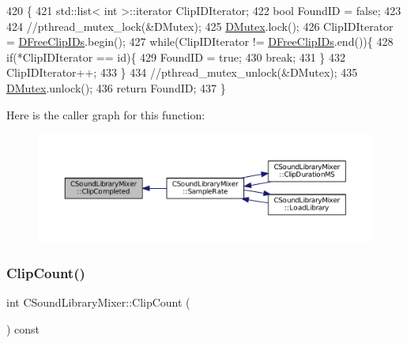 \begin{DoxyCode}
420                                             \{
421     std::list< int >::iterator ClipIDIterator;
422     \textcolor{keywordtype}{bool} FoundID = \textcolor{keyword}{false};
423     
424     \textcolor{comment}{//pthread\_mutex\_lock(&DMutex);}
425     \hyperlink{classCSoundLibraryMixer_a955562a0638df831413a1c6b8860f9fb}{DMutex}.lock();
426     ClipIDIterator = \hyperlink{classCSoundLibraryMixer_a32956ae09580a1ae4c9c037f0f7b5c0b}{DFreeClipIDs}.begin();
427     \textcolor{keywordflow}{while}(ClipIDIterator != \hyperlink{classCSoundLibraryMixer_a32956ae09580a1ae4c9c037f0f7b5c0b}{DFreeClipIDs}.end())\{
428         \textcolor{keywordflow}{if}(*ClipIDIterator == \textcolor{keywordtype}{id})\{
429             FoundID = \textcolor{keyword}{true};
430             \textcolor{keywordflow}{break};
431         \}
432         ClipIDIterator++;
433     \}
434     \textcolor{comment}{//pthread\_mutex\_unlock(&DMutex); }
435     \hyperlink{classCSoundLibraryMixer_a955562a0638df831413a1c6b8860f9fb}{DMutex}.unlock();
436     \textcolor{keywordflow}{return} FoundID;
437 \}
\end{DoxyCode}
Here is the caller graph for this function\+:
\nopagebreak
\begin{figure}[H]
\begin{center}
\leavevmode
\includegraphics[width=350pt]{classCSoundLibraryMixer_acd11bc59b6f11b1a8e1f0e821f0b8207_icgraph}
\end{center}
\end{figure}
\hypertarget{classCSoundLibraryMixer_a3abff4a43967eb0975ded98011c23e4e}{}\label{classCSoundLibraryMixer_a3abff4a43967eb0975ded98011c23e4e} 
\subsubsection{\texorpdfstring{Clip\+Count()}{ClipCount()}}
{\footnotesize\ttfamily int C\+Sound\+Library\+Mixer\+::\+Clip\+Count (\begin{DoxyParamCaption}{ }\end{DoxyParamCaption}) const\hspace{0.3cm}{\ttfamily [inline]}}



